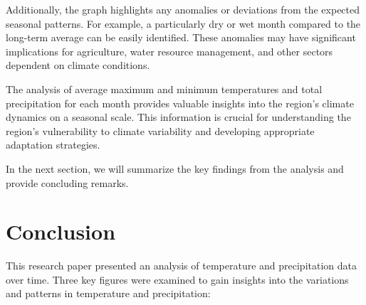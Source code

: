 \documentclass{article}
\begin{document}
Additionally, the graph highlights any anomalies or deviations from the expected seasonal patterns. For example, a particularly dry or wet month compared to the long-term average can be easily identified. These anomalies may have significant implications for agriculture, water resource management, and other sectors dependent on climate conditions.

The analysis of average maximum and minimum temperatures and total precipitation for each month provides valuable insights into the region's climate dynamics on a seasonal scale. This information is crucial for understanding the region's vulnerability to climate variability and developing appropriate adaptation strategies.

In the next section, we will summarize the key findings from the analysis and provide concluding remarks.

\section{Conclusion}

This research paper presented an analysis of temperature and precipitation data over time. Three key figures were examined to gain insights into the variations and patterns in temperature and precipitation:
\end{document}
